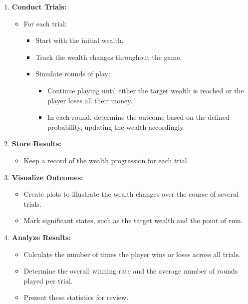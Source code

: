 \documentclass{article}
\begin{document}
\begin{itemize}
\begin{enumerate}
    \item \textbf{Conduct Trials:}
    \begin{itemize}
        \item For each trial:
        \begin{itemize}
            \item Start with the initial wealth.
            \item Track the wealth changes throughout the game.
            \item Simulate rounds of play:
            \begin{itemize}
                \item Continue playing until either the target wealth is reached or the player loses all their money.
                \item In each round, determine the outcome based on the defined probability, updating the wealth accordingly.
            \end{itemize}
        \end{itemize}
    \end{itemize}
    
    \item \textbf{Store Results:}
    \begin{itemize}
        \item Keep a record of the wealth progression for each trial.
    \end{itemize}
    
    \item \textbf{Visualize Outcomes:}
    \begin{itemize}
        \item Create plots to illustrate the wealth changes over the course of several trials.
        \item Mark significant states, such as the target wealth and the point of ruin.
    \end{itemize}
    
    \item \textbf{Analyze Results:}
    \begin{itemize}
        \item Calculate the number of times the player wins or loses across all trials.
        \item Determine the overall winning rate and the average number of rounds played per trial.
        \item Present these statistics for review.
    \end{itemize}
\end{enumerate}


\end{itemize}
\end{document}
